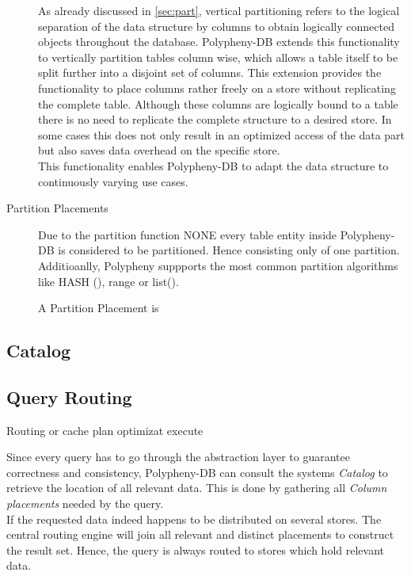 \begin{description}
    As already discussed in \ref{sec:part}, vertical partitioning refers to the logical 
    separation of the data structure by columns to obtain logically connected objects throughout 
    the database. 
    Polypheny-DB extends this functionality to vertically partition tables
    column wise, which allows a table itself to be split further into a disjoint 
    set of columns. This extension provides the functionality to place columns 
    rather freely on a store without replicating the complete table. 
    Although these columns are logically bound to a table there is no need 
    to replicate the complete structure to a desired store. In some cases 
    this does not only result in an optimized access of the data part but 
    also saves data overhead on the specific store.\\
    This functionality enables Polypheny-DB to adapt the data structure to continuously 
    varying use cases.\\

    \item [Partition Placements] Due to the partition function NONE every table entity inside Polypheny-DB is considered to be partitioned.  Hence consisting only of one partition.
    Additioanlly, Polypheny suppports the most common partition algorithms like HASH (), range or list(). 
    
    A Partition Placement is 
\end{description}






\subsection{Catalog}


\subsection{Query Routing}

Routing or cache plan optimizat execute

Since every query has to go through the abstraction layer to guarantee correctness 
and consistency, Polypheny-DB can consult the systems \textit{Catalog} to retrieve the
location of all relevant data. This is done by gathering all 
\textit{Column placements} needed by the query.\\ 
If the requested data indeed happens to be distributed
on several stores. The central routing engine will join all relevant and distinct 
placements to construct the result set. Hence, the query is always routed to stores which 
hold relevant data.


